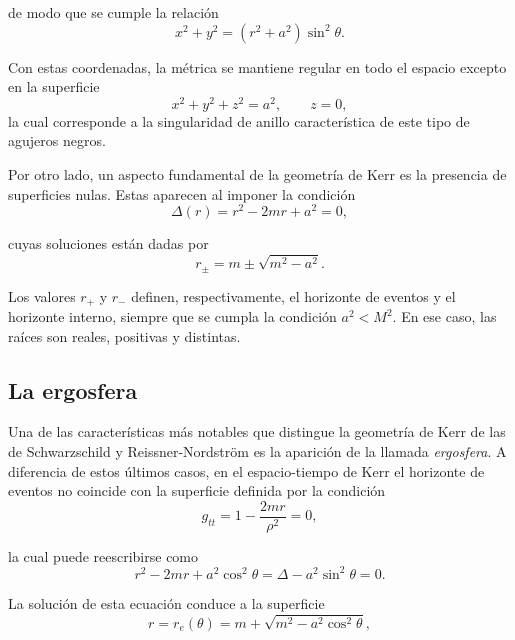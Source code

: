 de modo que se cumple la relación
\begin{equation}
    x^2+y^2=(r^2+a^2)\sin^2\theta .
\end{equation}


Con estas coordenadas, la métrica se mantiene regular en todo el espacio excepto en la superficie
\begin{equation}
    x^2+y^2+z^2=a^2 , \qquad z=0,
\end{equation}
la cual corresponde a la singularidad de anillo característica de este tipo de agujeros negros.

Por otro lado, un aspecto fundamental de la geometría de Kerr es la presencia de superficies nulas. Estas aparecen al imponer la condición
\begin{equation}
    \Delta(r)=r^2-2mr+a^2=0 ,
\end{equation}

cuyas soluciones están dadas por
\begin{equation}
    r_{\pm}=m \pm \sqrt{m^2-a^2}.
\end{equation}

Los valores $r_{+}$ y $r_{-}$ definen, respectivamente, el horizonte de eventos y el horizonte interno, siempre que se cumpla la condición $a^2<M^2$. En ese caso, las raíces son reales, positivas y distintas.

\subsection{La ergosfera}

Una de las características más notables que distingue la geometría de Kerr de las de Schwarzschild y Reissner-Nordström es la aparición de la llamada \textit{ergosfera}. A diferencia de estos últimos casos, en el espacio-tiempo de Kerr el horizonte de eventos no coincide con la superficie definida por la condición
\begin{equation}
    g_{tt}=1-\frac{2mr}{\rho^2}=0,
\end{equation}

la cual puede reescribirse como
\begin{equation}
    r^2-2mr+a^2\cos^2\theta = \Delta - a^2\sin^2\theta = 0 .
\end{equation}

La solución de esta ecuación conduce a la superficie
\begin{equation}
    r=r_e(\theta)=m+\sqrt{m^2-a^2\cos^2\theta},
\end{equation}

